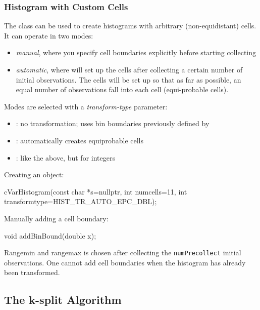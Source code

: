 \subsubsection{Histogram with Custom Cells}
\label{sec:sim-lib:histogram-with-custom-cells}


The  class can be used to create
histograms with arbitrary (non-equidistant) cells.
It can operate in two modes:

\begin{itemize}
  \item \textit{manual}, where you specify cell boundaries explicitly
     before starting collecting
  \item \textit{automatic}, where  will set up the cells
     after collecting a certain number of initial observations. The cells
     will be set up so that as far as possible, an equal number of observations
     fall into each cell (equi-probable cells).
\end{itemize}

Modes are selected with a \textit{transform-type} parameter:
\begin{itemize}
  \item{: no transformation; uses bin boundaries
    previously defined by }
  \item{: automatically creates equiprobable cells}
  \item{: like the above, but for integers}
\end{itemize}

Creating an object:

\begin{cpp}
cVarHistogram(const char *s=nullptr,
              int numcells=11,
              int transformtype=HIST_TR_AUTO_EPC_DBL);
\end{cpp}

Manually adding a cell boundary:

\begin{cpp}
void addBinBound(double x);
\end{cpp}

Rangemin and rangemax is chosen after collecting the
\texttt{numPrecollect} initial observations. One cannot add cell
boundaries when the histogram has already been transformed.




\subsection{The k-split Algorithm}
\label{sec:sim-lib:ksplit-algorithm}

